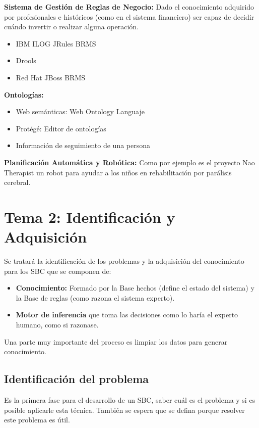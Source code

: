 \documentclass[12pt, twoside, openright]{report} %
\begin{document}
\textbf{Sistema de Gestión de Reglas de Negocio:} Dado el conocimiento adquirido por profesionales e históricos (como en el sistema financiero) ser capaz de decidir cuándo invertir o realizar alguna operación.
\begin{itemize}
	\item IBM ILOG JRules BRMS
	\item Drools
	\item Red Hat JBoss BRMS
\end{itemize}

\textbf{Ontologías:}
\begin{itemize}
	\item Web semánticas: Web Ontology Languaje
	\item Protégé: Editor de ontologías
	\item Información de seguimiento de una persona
\end{itemize}

\textbf{Planificación Automática y Robótica:} Como por ejemplo es el proyecto Nao Therapist un robot para ayudar a los niños en rehabilitación por parálisis cerebral.

\chapter{Tema 2: Identificación y Adquisición}
Se tratará la identificación de los problemas y la adquisición del conocimiento para los SBC que se componen de:
\begin{itemize}
	\item \textbf{Conocimiento:} Formado por la Base hechos (define el estado del sistema) y la Base de reglas (como razona el sistema experto).
	\item \textbf{Motor de inferencia} que toma las decisiones como lo haría el experto humano, como si razonase.
\end{itemize}

Una parte muy importante del proceso es limpiar los datos para generar conocimiento.

\section{Identificación del problema}
Es la primera fase para el desarrollo de un SBC, saber cuál es el problema y si es posible aplicarle esta técnica. También se espera que se defina porque resolver este problema es útil.
\end{document}
